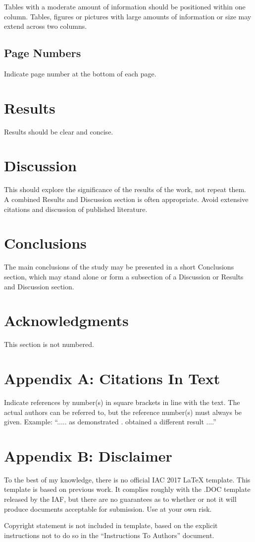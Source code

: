 \documentclass[]{iac}
\begin{document}
Tables with a moderate amount of information should be positioned
within one column. Tables, figures or pictures with large amounts of
information or size may extend across two columns.

\subsection{Page Numbers}
Indicate page number at the bottom of each page.

\section{Results}
Results should be clear and concise.

\section{Discussion}
This should explore the significance of the results of the work, not
repeat them. A combined Results and Discussion section is often
appropriate. Avoid extensive citations and discussion of published
literature.

\section{Conclusions}
The main conclusions of the study may be presented in a short
Conclusions section, which may stand alone or form a subsection of a
Discussion or Results and Discussion section.

\section*{Acknowledgments}
This section is not numbered.

\section*{Appendix A: Citations In Text}
Indicate references by number(s) in square brackets in line with the
text. The actual authors can be referred to, but the reference
number(s) must always be given.  Example: “..... as demonstrated
\cite{von1975history,hunley1999history}.  \cite{neufeld1990weimar}
obtained a different result ....”

\section*{Appendix B: Disclaimer}
To the best of my knowledge, there is no official IAC 2017 \LaTeX{}
template.  This template is based on previous work.  It complies
roughly with the .DOC template released by the IAF, but there are no
guarantees as to whether or not it will produce documents acceptable
for submission. Use at your own risk.

Copyright statement is not included in template, based on the explicit
instructions not to do so in the ``Instructions To Authors'' document.
 
\end{document}
